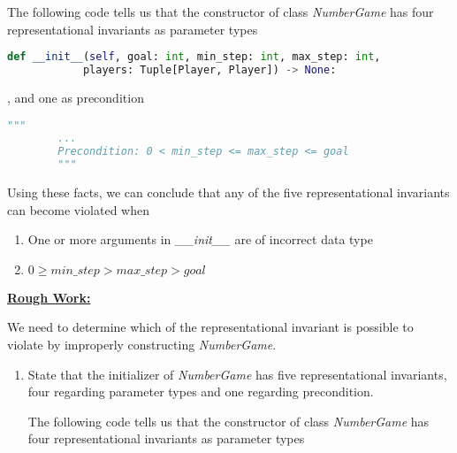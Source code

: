 \documentclass[12pt]{article}
\begin{document}
\begin{enumerate}[1.]
\begin{itemize}
        The following code tells us that the constructor of class \textit{NumberGame} has four
        representational invariants as parameter types

        \bigskip

        \begin{lstlisting}[language=Python]
        def __init__(self, goal: int, min_step: int, max_step: int,
            players: Tuple[Player, Player]) -> None:
        \end{lstlisting}

        \bigskip

        , and one as precondition

        \bigskip

        \begin{lstlisting}[language=Python]
        """
        ...
        Precondition: 0 < min_step <= max_step <= goal
        """
        \end{lstlisting}

        \bigskip

        Using these facts, we can conclude that any of the five
        representational invariants can become violated when

        \begin{enumerate}[1.]
            \item One or more arguments in \textit{\_\_init\_\_} are of incorrect data type
            \item $0 \geq \textit{min\_step} > \textit{max\_step} > \textit{goal}$
        \end{enumerate}


        \bigskip

        \begin{mdframed}
            \underline{\textbf{Rough Work:}}

            \bigskip

            We need to determine which of the representational invariant is
            possible to violate by improperly constructing \textit{NumberGame}.

            \bigskip

            \begin{enumerate}[1.]
                \item State that the initializer of \textit{NumberGame} has
                five representational invariants, four regarding parameter types
                and one regarding precondition.

                \begin{mdframed}
                The following code tells us that the constructor of class \textit{NumberGame} has four
                representational invariants as parameter types


\end{mdframed}
\end{enumerate}
\end{mdframed}
\end{itemize}
\end{enumerate}
\end{document}
